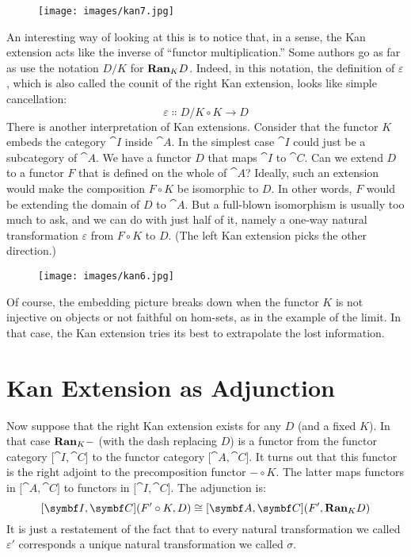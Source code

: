 \begin{figure}[H]
\centering
\texttt{[image: images/kan7.jpg]}
\end{figure}

\noindent
An interesting way of looking at this is to notice that, in a sense, the
Kan extension acts like the inverse of ``functor multiplication.'' Some
authors go as far as use the notation $D/K$ for $\mathbf{Ran}_{K}D$.
Indeed, in this notation, the definition of $\varepsilon$, which is also
called the counit of the right Kan extension, looks like simple
cancellation:
\[\varepsilon \Colon D/K \circ K \to D\]
There is another interpretation of Kan extensions. Consider that the
functor $K$ embeds the category $\cat{I}$ inside $\cat{A}$. In the
simplest case $\cat{I}$ could just be a subcategory of $\cat{A}$. We have
a functor $D$ that maps $\cat{I}$ to $\cat{C}$. Can we extend
$D$ to a functor $F$ that is defined on the whole of
$\cat{A}$? Ideally, such an extension would make the composition
$F \circ K$ be isomorphic to $D$. In other words, $F$
would be extending the domain of $D$ to $\cat{A}$. But a
full-blown isomorphism is usually too much to ask, and we can do with
just half of it, namely a one-way natural transformation $\varepsilon$ from
$F \circ K$ to $D$. (The left Kan extension picks the other direction.)

\begin{figure}[H]
\centering
\texttt{[image: images/kan6.jpg]}
\end{figure}

\noindent
Of course, the embedding picture breaks down when the functor $K$
is not injective on objects or not faithful on hom-sets, as in the
example of the limit. In that case, the Kan extension tries its best to
extrapolate the lost information.

\section{Kan Extension as Adjunction}

Now suppose that the right Kan extension exists for any $D$ (and
a fixed $K$). In that case $\mathbf{Ran}_{K}-$ (with the dash
replacing $D$) is a functor from the functor category
${[}\cat{I}, \cat{C}{]}$ to the functor category ${[}\cat{A}, \cat{C}{]}$. It
turns out that this functor is the right adjoint to the precomposition
functor $- \circ K$. The latter maps functors in ${[}\cat{A}, \cat{C}{]}$
to functors in ${[}\cat{I}, \cat{C}{]}$. The adjunction is:
\[[\cat{I}, \cat{C}](F' \circ K, D) \cong [\cat{A}, \cat{C}](F', \Ran_{K}D)\]
It is just a restatement of the fact that to every natural
transformation we called $\varepsilon'$ corresponds a unique natural
transformation we called $\sigma$.

